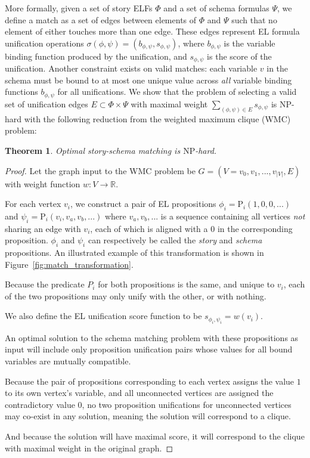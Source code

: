 More formally, given a set of story ELFs $\Phi$ and a set of schema formulas $\Psi$, we define a match as a set of edges between elements of $\Phi$ and $\Psi$ such that no element of either touches more than one edge. These edges represent EL formula unification operations $\sigma(\phi, \psi) = (b_{\phi,\psi}, s_{\phi,\psi})$, where $b_{\phi,\psi}$ is the variable binding function produced by the unification, and $s_{\phi,\psi}$ is the score of the unification. Another constraint exists on valid matches: each variable $v$ in the schema must be bound to at most one unique value across \textit{all} variable binding functions $b_{\phi,\psi}$ for all unifications. We show that the problem of selecting a valid set of unification edges $E \subset \Phi \times \Psi$ with maximal weight $\sum_{(\phi,\psi) \in E} s_{\phi,\psi}$ is $\mathrm{NP}$-hard with the following reduction from the weighted maximum clique (WMC) problem:

\newtheorem{theorem}{Theorem}
\begin{theorem}
\label{thm:npcomplete}
Optimal story-schema matching is $\mathrm{NP}$-hard.
\end{theorem}
\begin{proof}
Let the graph input to the WMC problem be $G = (V={v_{0}, v_{1}, ..., v_{|V|}},E)$ with weight function $w : V \to \mathbb{R}$.

For each vertex $v_{i}$, we construct a pair of EL propositions $\phi_{i} = \text{P}_{i}(1,0,0,...)$ and $\psi_{i} = \text{P}_{i}(v_{i},v_{a},v_{b},...)$ where $v_{a},v_{b},...$ is a sequence containing all vertices \textit{not} sharing an edge with $v_{i}$, each of which is aligned with a $0$ in the corresponding proposition.
$\phi_{i}$ and $\psi_{i}$ can respectively be called the \textit{story} and \textit{schema} propositions.
An illustrated example of this transformation is shown in Figure~\ref{fig:match_transformation}.

Because the predicate $P_{i}$ for both propositions is the same, and unique to $v_{i}$, each of the two propositions may only unify with the other, or with nothing.

We also define the EL unification score function to be $s_{\phi_{i},\psi_{i}} = w(v_{i})$.

An optimal solution to the schema matching problem with these propositions as input will include only proposition unification pairs whose values for all bound variables are mutually compatible.

Because the pair of propositions corresponding to each vertex assigns the value $1$ to its own vertex's variable, and all unconnected vertices are assigned the contradictory value $0$, no two proposition unifications for unconnected vertices may co-exist in any solution, meaning the solution will correspond to a clique.

And because the solution will have maximal score, it will correspond to the clique with maximal weight in the original graph.
\end{proof}

